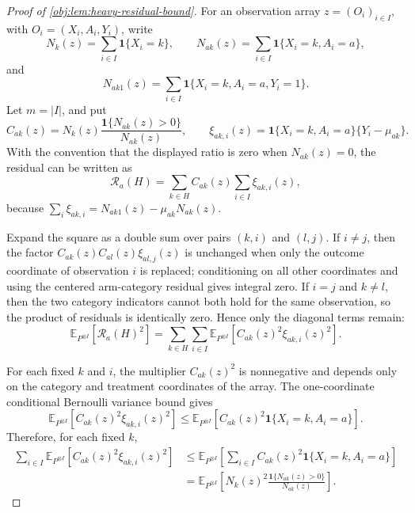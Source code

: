 \documentclass[11pt]{article}
\begin{document}
\begin{proof}[Proof of \cref{obj:lem:heavy-residual-bound}]
For an observation array \(z=(O_i)_{i\in I}\), with \(O_i=(X_i,A_i,Y_i)\), write
\[
N_k(z)=\sum_{i\in I}\mathbf 1\{X_i=k\},
\qquad
N_{ak}(z)=\sum_{i\in I}\mathbf 1\{X_i=k,A_i=a\},
\]
and
\[
N_{ak1}(z)=\sum_{i\in I}\mathbf 1\{X_i=k,A_i=a,Y_i=1\}.
\]
Let \(m=|I|\), and put
\[
C_{ak}(z)
=
N_k(z)\frac{\mathbf 1\{N_{ak}(z)>0\}}{N_{ak}(z)},
\qquad
\xi_{ak,i}(z)
=
\mathbf 1\{X_i=k,A_i=a\}\{Y_i-\mu_{ak}\}.
\]
With the convention that the displayed ratio is zero when \(N_{ak}(z)=0\), the residual can be written as
\[
\mathcal R_a(H)
=
\sum_{k\in H}C_{ak}(z)\sum_{i\in I}\xi_{ak,i}(z),
\]
because \(\sum_i\xi_{ak,i}=N_{ak1}(z)-\mu_{ak}N_{ak}(z)\).

Expand the square as a double sum over pairs \((k,i)\) and \((l,j)\). If \(i\ne j\), then the factor
\(C_{ak}(z)C_{al}(z)\xi_{al,j}(z)\) is unchanged when only the outcome coordinate of observation \(i\) is replaced; conditioning on all other coordinates and using the centered arm-category residual gives integral zero. If \(i=j\) and \(k\ne l\), then the two category indicators cannot both hold for the same observation, so the product of residuals is identically zero. Hence only the diagonal terms remain:
\[
\mathbb E_{P^{\otimes I}}\!\left[\mathcal R_a(H)^2\right]
=
\sum_{k\in H}\sum_{i\in I}
\mathbb E_{P^{\otimes I}}\!\left[C_{ak}(z)^2\xi_{ak,i}(z)^2\right].
\]

For each fixed \(k\) and \(i\), the multiplier \(C_{ak}(z)^2\) is nonnegative and depends only on the category and treatment coordinates of the array. The one-coordinate conditional Bernoulli variance bound gives
\[
\mathbb E_{P^{\otimes I}}\!\left[C_{ak}(z)^2\xi_{ak,i}(z)^2\right]
\le
\mathbb E_{P^{\otimes I}}\!\left[
C_{ak}(z)^2\mathbf 1\{X_i=k,A_i=a\}
\right].
\]
Therefore, for each fixed \(k\),
\[
\begin{aligned}
\sum_{i\in I}
\mathbb E_{P^{\otimes I}}\!\left[C_{ak}(z)^2\xi_{ak,i}(z)^2\right]
&\le
\mathbb E_{P^{\otimes I}}\!\left[
\sum_{i\in I}C_{ak}(z)^2\mathbf 1\{X_i=k,A_i=a\}
\right]\\
&=
\mathbb E_{P^{\otimes I}}\!\left[
N_k(z)^2\frac{\mathbf 1\{N_{ak}(z)>0\}}{N_{ak}(z)}
\right].
\end{aligned}
\]


\end{proof}
\end{document}
